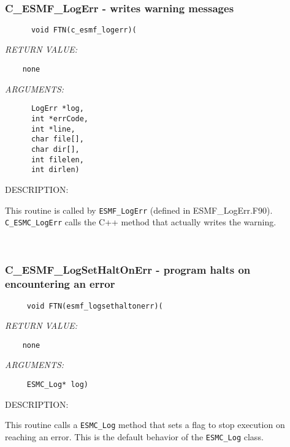  
\mbox{}\hrulefill\ 
 
\subsubsection [C\_ESMF\_LogErr] {C\_ESMF\_LogErr - writes warning messages}


  
\begin{verbatim}      void FTN(c_esmf_logerr)(\end{verbatim}{\em RETURN VALUE:}
\begin{verbatim}    none\end{verbatim}{\em ARGUMENTS:}
\begin{verbatim}      LogErr *log,
      int *errCode,
      int *line, 
      char file[],
      char dir[],
      int filelen,
      int dirlen)\end{verbatim}
{\sf DESCRIPTION:\\ }


      This routine is called by {\tt ESMF\_LogErr} (defined in ESMF\_LogErr.F90). 
      {\tt C\_ESMC\_LogErr} calls the C++ method that actually writes the warning.
   
 
\mbox{}\hrulefill\ 
 

  \subsubsection [C\_ESMF\_LogSetHaltOnErr] {C\_ESMF\_LogSetHaltOnErr - program halts on encountering an error}


  
\begin{verbatim}     void FTN(esmf_logsethaltonerr)(\end{verbatim}{\em RETURN VALUE:}
\begin{verbatim}    none\end{verbatim}{\em ARGUMENTS:}
\begin{verbatim}     ESMC_Log* log)\end{verbatim}
{\sf DESCRIPTION:\\ }


      This routine calls a {\tt ESMC\_Log} method that sets
      a flag to stop execution on
      reaching an error. This is the default behavior of the {\tt ESMC\_Log} class. 
 
